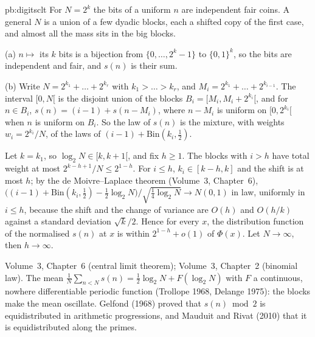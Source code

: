 \begin{solution}{pb:digitsclt}
\idea For $N=2^k$ the bits of a uniform $n$ are independent fair coins. A general $N$ is a union of a few dyadic blocks, each a shifted
copy of the first case, and almost all the mass sits in the big blocks.

\writeup (a) $n\mapsto$ its $k$ bits is a bijection from $\{0,\dots,2^k-1\}$ to $\{0,1\}^k$, so the bits are independent and fair, and
$s(n)$ is their sum.

(b) Write $N=2^{k_1}+\dots+2^{k_r}$ with $k_1>\dots>k_r$, and $M_i=2^{k_1}+\dots+2^{k_{i-1}}$. The interval $[0,N[$ is the disjoint union of
the blocks $B_i=[M_i,M_i+2^{k_i}[$, and for $n\in B_i$, $s(n)=(i-1)+s(n-M_i)$, where $n-M_i$ is uniform on $[0,2^{k_i}[$ when $n$ is uniform
on $B_i$. So the law of $s(n)$ is the mixture, with weights $w_i=2^{k_i}/N$, of the laws of $(i-1)+\mathrm{Bin}(k_i,\frac12)$.

Let $k=k_1$, so $\log_2N\in[k,k+1[$, and fix $h\ge1$. The blocks with $i>h$ have total weight at most $2^{k-h+1}/N\le2^{1-h}$. For
$i\le h$, $k_i\in[k-h,k]$ and the shift is at most $h$; by the de Moivre--Laplace theorem (Volume~3, Chapter~6),
$\bigl((i-1)+\mathrm{Bin}(k_i,\frac12)-\frac12\log_2N\bigr)/\sqrt{\frac14\log_2N}\to N(0,1)$ in law, uniformly in $i\le h$, because the shift
and the change of variance are $O(h)$ and $O(h/k)$ against a standard deviation $\sqrt k/2$. Hence for every $x$, the distribution
function of the normalised $s(n)$ at $x$ is within $2^{1-h}+o(1)$ of $\Phi(x)$. Let $N\to\infty$, then $h\to\infty$.

\tools Volume~3, Chapter~6 (central limit theorem); Volume~3, Chapter~2 (binomial law).
\leads The mean $\frac1N\sum_{n<N}s(n)=\frac12\log_2N+F(\log_2N)$ with $F$ a continuous, nowhere differentiable periodic function
(Trollope 1968, Delange 1975): the blocks make the mean oscillate. Gelfond (1968) proved that $s(n)\bmod2$ is equidistributed in
arithmetic progressions, and Mauduit and Rivat (2010) that it is equidistributed along the primes.
\end{solution}

